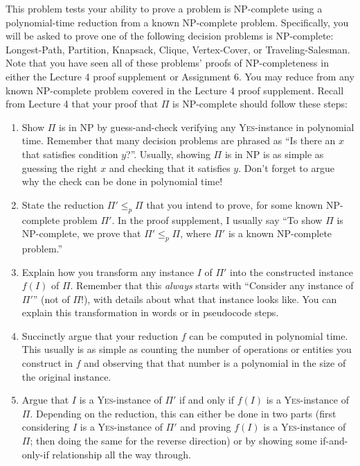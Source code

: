 \documentclass[10pt]{article}
\begin{document}
This problem tests your ability to prove a problem is NP-complete using a polynomial-time reduction from a known NP-complete problem.
Specifically, you will be asked to prove one of the following decision problems is NP-complete: \textsf{Longest-Path}, \textsf{Partition}, \textsf{Knapsack}, \textsf{Clique}, \textsf{Vertex-Cover}, or \textsf{Traveling-Salesman}.
Note that you have seen all of these problems' proofs of NP-completeness in either the Lecture 4 proof supplement or Assignment 6.
You may reduce from any known NP-complete problem covered in the Lecture 4 proof supplement.
Recall from Lecture 4 that your proof that $\Pi$ is NP-complete should follow these steps:
\begin{enumerate}
    \item Show $\Pi$ is in NP by guess-and-check verifying any \textsc{Yes}-instance in polynomial time.
    Remember that many decision problems are phrased as ``Is there an $x$ that satisfies condition $y$?''.
    Usually, showing $\Pi$ is in NP is as simple as guessing the right $x$ and checking that it satisfies $y$.
    Don't forget to argue why the check can be done in polynomial time!

    \item State the reduction $\Pi' \leq_p \Pi$ that you intend to prove, for some known NP-complete problem $\Pi'$.
    In the proof supplement, I usually say ``To show $\Pi$ is NP-complete, we prove that $\Pi' \leq_p \Pi$, where $\Pi'$ is a known NP-complete problem.''

    \item Explain how you transform any instance $I$ of $\Pi'$ into the constructed instance $f(I)$ of $\Pi$.
    Remember that this \textit{always} starts with ``Consider any instance of $\Pi'$'' (not of $\Pi$!), with details about what that instance looks like.
    You can explain this transformation in words or in pseudocode steps.

    \item Succinctly argue that your reduction $f$ can be computed in polynomial time.
    This usually is as simple as counting the number of operations or entities you construct in $f$ and observing that that number is a polynomial in the size of the original instance.

    \item Argue that $I$ is a \textsc{Yes}-instance of $\Pi'$ if and only if $f(I)$ is a \textsc{Yes}-instance of $\Pi$.
    Depending on the reduction, this can either be done in two parts (first considering $I$ is a \textsc{Yes}-instance of $\Pi'$ and proving $f(I)$ is a \textsc{Yes}-instance of $\Pi$; then doing the same for the reverse direction) or by showing some if-and-only-if relationship all the way through.
\end{enumerate}
\end{document}
